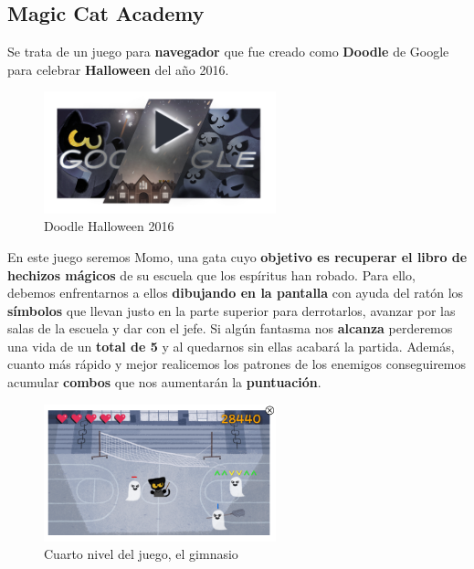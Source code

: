 \subsection{Magic Cat Academy }

Se trata de un juego para \textbf{navegador} que fue creado como \textbf{Doodle} de Google para celebrar \textbf{Halloween} del año 2016.

\clearpage


\begin{figure}[htbp]
\centering
  \includegraphics[width=0.6\textwidth]{archivos/doodle.png}
  \caption{Doodle Halloween 2016}
  \label{fig:doodle}
\end{figure}

\vspace{0.5cm}

En este juego seremos Momo, una gata cuyo \textbf{objetivo es recuperar el libro de hechizos mágicos} de su escuela que los espíritus han robado. Para ello, debemos enfrentarnos a ellos  \textbf{dibujando en la pantalla} con ayuda del ratón los  \textbf{símbolos} que llevan justo en la parte superior para derrotarlos, avanzar por las salas de la escuela y dar con el jefe. Si algún fantasma nos  \textbf{alcanza} perderemos una {vida} de un  \textbf{total de 5} y al quedarnos sin ellas acabará la partida. Además, cuanto más rápido y mejor realicemos los patrones de los enemigos conseguiremos acumular  \textbf{combos} que nos aumentarán la  \textbf{puntuación}.

\begin{figure}[htbp]
\centering
  \includegraphics[width=0.6\textwidth]{archivos/juego.png}
  \caption{Cuarto nivel del juego, el gimnasio}
  \label{fig:halloweencat1}
\end{figure}

